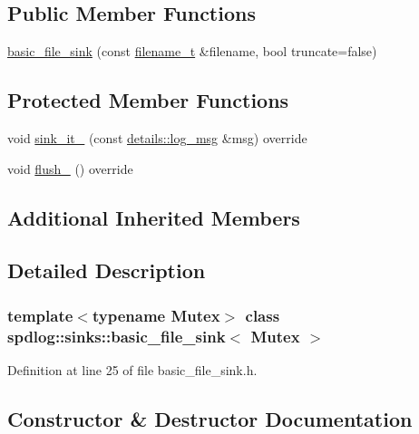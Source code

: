 \subsection*{Public Member Functions}
\begin{DoxyCompactItemize}
\item 
\hyperlink{classspdlog_1_1sinks_1_1basic__file__sink_a799e95cc46fd69b03f4ef7497aa21436}{basic\+\_\+file\+\_\+sink} (const \hyperlink{namespacespdlog_acf7ce125b3622e44f8f1702d699e0b06}{filename\+\_\+t} \&filename, bool truncate=false)
\end{DoxyCompactItemize}
\subsection*{Protected Member Functions}
\begin{DoxyCompactItemize}
\item 
void \hyperlink{classspdlog_1_1sinks_1_1basic__file__sink_a8d9239f225478ade4e879dc643f577ba}{sink\+\_\+it\+\_\+} (const \hyperlink{structspdlog_1_1details_1_1log__msg}{details\+::log\+\_\+msg} \&msg) override
\item 
void \hyperlink{classspdlog_1_1sinks_1_1basic__file__sink_a689a12d9459d081edff7f8c7d3af227c}{flush\+\_\+} () override
\end{DoxyCompactItemize}
\subsection*{Additional Inherited Members}


\subsection{Detailed Description}
\subsubsection*{template$<$typename Mutex$>$\newline
class spdlog\+::sinks\+::basic\+\_\+file\+\_\+sink$<$ Mutex $>$}



Definition at line 25 of file basic\+\_\+file\+\_\+sink.\+h.



\subsection{Constructor \& Destructor Documentation}
\mbox{\label{classspdlog_1_1sinks_1_1basic__file__sink_a799e95cc46fd69b03f4ef7497aa21436}} 
